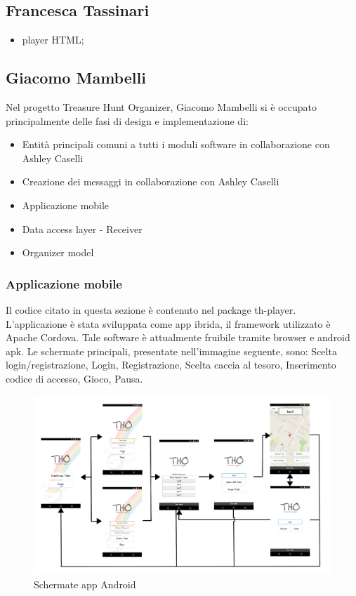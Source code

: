 \documentclass[12pt, italian]{article}
\begin{document}
\subsection{Francesca Tassinari}
\begin{itemize}
	\item player HTML;
\end{itemize}
\subsection{Giacomo Mambelli}
Nel progetto Treasure Hunt Organizer, Giacomo Mambelli si è occupato principalmente delle fasi di design e implementazione di:
\begin{itemize}
	\item Entità principali comuni a tutti i moduli software in collaborazione con Ashley Caselli
	\item Creazione dei messaggi in collaborazione con Ashley Caselli
	\item Applicazione mobile
	\item Data access layer - Receiver
	\item Organizer model
\end{itemize}
\subsubsection{Applicazione mobile}
Il codice citato in questa sezione è contenuto nel package th-player.
L'applicazione è stata sviluppata come app ibrida, il framework utilizzato è Apache Cordova.
Tale software è attualmente fruibile tramite browser e android apk.
Le schermate principali, presentate nell'immagine seguente, sono: Scelta login/registrazione, Login, Registrazione, Scelta caccia al tesoro, Inserimento codice di accesso, Gioco, Pausa.

\begin{figure}[H]
	\centering
	\includegraphics[width=1\textwidth]{img/flusso01.png}
	\caption{Schermate app Android}
\end{figure}
\end{document}
